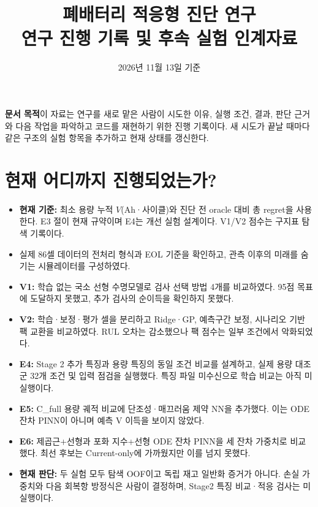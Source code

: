 \documentclass[11pt,a4paper]{article}
\title{\textbf{폐배터리 적응형 진단 연구}\\[.4em]\large 연구 진행 기록 및 후속 실험 인계자료}
\author{}
\date{2026년 11월 13일 기준}
\begin{document}
\maketitle
\vspace{-1em}

\textbf{문서 목적}\quad 이 자료는 연구를 새로 맡은 사람이 시도한 이유, 실행 조건, 결과, 판단 근거와 다음 작업을 파악하고 코드를 재현하기 위한 진행 기록이다. 새 시도가 끝날 때마다 같은 구조의 실험 항목을 추가하고 현재 상태를 갱신한다.

\section*{현재 어디까지 진행되었는가?}
\begin{itemize}
\item \textbf{현재 기준:} 최소 용량 누적 $V$(Ah·사이클)와 진단 전 oracle 대비 총 regret을 사용한다. E3 절이 현재 규약이며 E4는 개선 실험 설계이다. V1/V2 점수는 구지표 탐색 기록이다.
\item 실제 86셀 데이터의 전처리 형식과 EOL 기준을 확인하고, 관측 이후의 미래를 숨기는 시뮬레이터를 구성하였다.
\item \textbf{V1:} 학습 없는 국소 선형 수명모델로 검사 선택 방법 4개를 비교하였다. 95점 목표에 도달하지 못했고, 추가 검사의 순이득을 확인하지 못했다.
\item \textbf{V2:} 학습·보정·평가 셀을 분리하고 Ridge·GP, 예측구간 보정, 시나리오 기반 팩 교환을 비교하였다. RUL 오차는 감소했으나 팩 점수는 일부 조건에서 악화되었다.
\item \textbf{E4:} Stage 2 추가 특징과 용량 특징의 동일 조건 비교를 설계하고, 실제 용량 대조군 32개 조건 및 입력 점검을 실행했다. 특징 파일 미수신으로 학습 비교는 아직 미실행이다.
\item \textbf{E5:} C\_full 용량 궤적 비교에 단조성·매끄러움 제약 NN을 추가했다. 이는 ODE 잔차 PINN이 아니며 예측 V 이득을 보이지 않았다.
\item \textbf{E6:} 제곱근+선형과 포화 지수+선형 ODE 잔차 PINN을 세 잔차 가중치로 비교했다. 최선 후보는 Current-only에 가까웠지만 이를 넘지 못했다.
\item \textbf{현재 판단:} 두 실험 모두 탐색 OOF이고 독립 재고 일반화 증거가 아니다. 손실 가중치와 다음 회복항 방정식은 사람이 결정하며, Stage2 특징 비교·적응 검사는 미실행이다.
\end{itemize}
\end{document}
